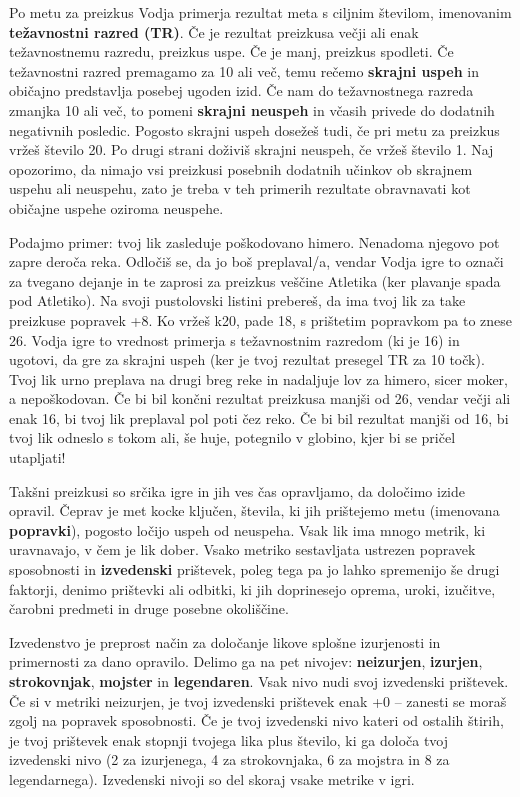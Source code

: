 Po metu za preizkus Vodja primerja rezultat meta s ciljnim številom, imenovanim \textbf{težavnostni razred (TR)}. Če je rezultat preizkusa večji ali enak težavnostnemu razredu, preizkus uspe. Če je manj, preizkus spodleti. Če težavnostni razred premagamo za 10 ali več, temu rečemo \textbf{skrajni uspeh} in običajno predstavlja posebej ugoden izid. Če nam do težavnostnega razreda zmanjka 10 ali več, to pomeni \textbf{skrajni neuspeh} in včasih privede do dodatnih negativnih posledic. Pogosto skrajni uspeh dosežeš tudi, če pri metu za preizkus vržeš število 20. Po drugi strani doživiš skrajni neuspeh, če vržeš število 1. Naj opozorimo, da nimajo vsi preizkusi posebnih dodatnih učinkov ob skrajnem uspehu ali neuspehu, zato je treba v teh primerih rezultate obravnavati kot običajne uspehe oziroma neuspehe.

Podajmo primer: tvoj lik zasleduje poškodovano himero. Nenadoma njegovo pot zapre deroča reka. Odločiš se, da jo boš preplaval/a, vendar Vodja igre to označi za tvegano dejanje in te zaprosi za preizkus veščine Atletika (ker plavanje spada pod Atletiko). Na svoji pustolovski listini prebereš, da ima tvoj lik za take preizkuse popravek +8. Ko vržeš k20, pade 18, s prištetim popravkom pa to znese 26. Vodja igre to vrednost primerja s težavnostnim razredom (ki je 16) in ugotovi, da gre za skrajni uspeh (ker je tvoj rezultat presegel TR za 10 točk). Tvoj lik urno preplava na drugi breg reke in nadaljuje lov za himero, sicer moker, a nepoškodovan. Če bi bil končni rezultat preizkusa manjši od 26, vendar večji ali enak 16, bi tvoj lik preplaval pol poti čez reko. Če bi bil rezultat manjši od 16, bi tvoj lik odneslo s tokom ali, še huje, potegnilo v globino, kjer bi se pričel utapljati!

Takšni preizkusi so srčika igre in jih ves čas opravljamo, da določimo izide opravil. Čeprav je met kocke ključen, števila, ki jih prištejemo metu (imenovana \textbf{popravki}), pogosto ločijo uspeh od neuspeha. Vsak lik ima mnogo metrik, ki uravnavajo, v čem je lik dober. Vsako metriko sestavljata ustrezen popravek sposobnosti in \textbf{izvedenski} prištevek, poleg tega pa jo lahko spremenijo še drugi faktorji, denimo prištevki ali odbitki, ki jih doprinesejo oprema, uroki, izučitve, čarobni predmeti in druge posebne okoliščine.

Izvedenstvo je preprost način za določanje likove splošne izurjenosti in primernosti za dano opravilo. Delimo ga na pet nivojev: \textbf{neizurjen}, \textbf{izurjen}, \textbf{strokovnjak}, \textbf{mojster} in \textbf{legendaren}. Vsak nivo nudi svoj izvedenski prištevek. Če si v metriki neizurjen, je tvoj izvedenski prištevek enak +0 -- zanesti se moraš zgolj na popravek sposobnosti. Če je tvoj izvedenski nivo kateri od ostalih štirih, je tvoj prištevek enak stopnji tvojega lika plus število, ki ga določa tvoj izvedenski nivo (2 za izurjenega, 4 za strokovnjaka, 6 za mojstra in 8 za legendarnega). Izvedenski nivoji so del skoraj vsake metrike v igri.

